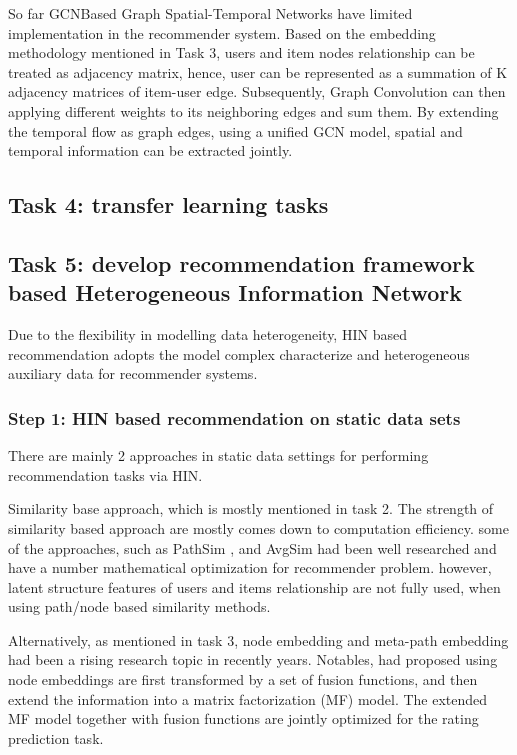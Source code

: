 So far GCNBased Graph Spatial-Temporal Networks have limited implementation in the recommender system. Based on the embedding methodology mentioned in Task 3, users and item nodes relationship can be treated as adjacency matrix, hence, user can be represented as a summation of K adjacency matrices of item-user edge. Subsequently, Graph Convolution can then applying different weights to its neighboring edges and sum them. By extending the temporal flow as graph edges, using a unified GCN model, spatial and temporal information can be extracted jointly.

\subsection{Task 4: transfer learning tasks}



\subsection{Task 5: develop recommendation framework based Heterogeneous Information Network}

Due to the flexibility in modelling data heterogeneity, HIN based recommendation adopts the model complex characterize and heterogeneous auxiliary data for recommender systems.

\subsubsection*{Step 1: HIN based recommendation on static data sets}
There are mainly 2 approaches in static data settings for performing recommendation tasks via HIN. 

Similarity base approach, which is mostly mentioned in task 2. The strength of similarity based approach are mostly comes down to computation efficiency. some of the approaches, such as PathSim \citep{Sun2011PathSim}, and AvgSim \citep{xiao2016avgsim} had been well researched and have a number mathematical optimization for recommender problem. however, latent structure features of users and items relationship are not fully used, when using path/node based similarity methods.

Alternatively, as mentioned in task 3, node embedding and meta-path embedding had been a rising research topic in recently years. Notables, \citet{shi2018heterogeneous} had proposed using node embeddings are first transformed by a set of fusion functions, and then extend the information into a matrix factorization (MF) model. The extended MF model together with fusion functions are jointly optimized for the rating prediction task.

